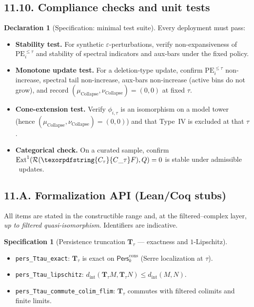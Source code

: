 \documentclass[11pt]{article}
\DeclareMathOperator{\Ext}{Ext}
\DeclareRobustCommand{\hyp}{\nobreakdash-}
\newcommand{\Pers}{\mathsf{Pers}}
\newcommand{\Rfun}{\mathcal{R}}
\numberwithin{equation}{section}
\theoremstyle{definition}
\newtheorem{specification}[theorem]{Specification}
\newtheorem{declaration}[theorem]{Declaration}
\DeclareRobustCommand{\Ctau}{\texorpdfstring{\ensuremath{C_{\tau}}}{C\_\tau}}
\DeclareRobustCommand{\muc}{\mu_{\mathrm{Collapse}}}
\DeclareRobustCommand{\nuc}{\nu_{\mathrm{Collapse}}}
\DeclareRobustCommand{\fqi}{\text{f.q.i.}}
\begin{document}
\subsection*{11.10. Compliance checks and unit tests}
\begin{declaration}[Specification: minimal test suite]\label{spec:11-tests}
Every deployment must pass:
\begin{itemize}
  \item \textbf{Stability test.} For synthetic $\varepsilon$-perturbations, verify non\hyp expansiveness of $\mathrm{PE}_{i}^{\le \tau}$ and stability of spectral indicators and aux-bars under the fixed policy.
  \item \textbf{Monotone update test.} For a deletion-type update, confirm $\mathrm{PE}_{i}^{\le \tau}$ non-increase, spectral tail non-increase, aux-bars non-increase (active bins do not grow), and record $(\muc,\nuc)=(0,0)$ at fixed $\tau$.
  \item \textbf{Cone-extension test.} Verify $\phi_{i,\tau}$ is an isomorphism on a model tower (hence $(\muc,\nuc)=(0,0)$) and that Type~IV is excluded at that $\tau$.
  \item \textbf{Categorical check.} On a curated sample, confirm $\Ext^1(\Rfun(\Ctau F),Q)=0$ is stable under admissible \fqi\ updates.
\end{itemize}
\end{declaration}

\subsection*{11.A. Formalization API (Lean/Coq stubs)}
All items are stated in the constructible range and, at the filtered–complex layer, \emph{up to filtered quasi-isomorphism}. Identifiers are indicative.

\begin{specification}[Persistence truncation $\mathbf{T}_\tau$ — exactness and $1$-Lipschitz]
\begin{itemize}
  \item \texttt{pers\_Ttau\_exact}: $\mathbf{T}_\tau$ is exact on $\Pers^{\mathrm{cons}}_k$ (Serre localization at $\tau$).
  \item \texttt{pers\_Ttau\_lipschitz}: $d_{\mathrm{int}}(\mathbf{T}_\tau M,\mathbf{T}_\tau N)\le d_{\mathrm{int}}(M,N)$.
  \item \texttt{pers\_Ttau\_commute\_colim\_flim}: $\mathbf{T}_\tau$ commutes with filtered colimits and finite limits.
\end{itemize}
\end{specification}
\end{document}
